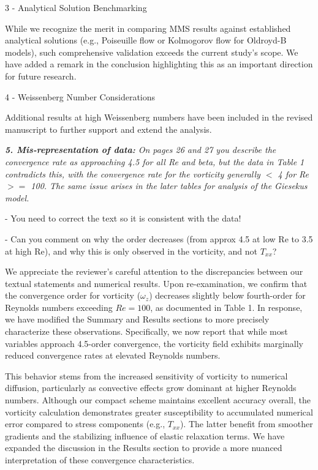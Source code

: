 \documentclass[12pt]{article}
\begin{document}
3 - Analytical Solution Benchmarking

While we recognize the merit in comparing MMS results against established analytical solutions (e.g., Poiseuille flow or Kolmogorov flow for Oldroyd-B models), such comprehensive validation exceeds the current study's scope. We have added a remark in the conclusion highlighting this as an important direction for future research.

4 - Weissenberg Number Considerations

Additional results at high Weissenberg numbers have been included in the revised manuscript to further support and extend the analysis.


\vspace{3mm}
{\it \textbf{5. Mis-representation of data:} On pages 26 and 27 you describe the convergence rate as approaching 4.5 for all Re and beta, but the data in Table 1 contradicts this, with the convergence rate for the vorticity generally $<$ 4 for Re $>=$ 100. The same issue arises in the later tables for analysis of the Giesekus model.

- You need to correct the text so it is consistent with the data!

- Can you comment on why the order decreases (from approx 4.5 at low Re to 3.5 at high Re), and why this is only observed in the vorticity, and not $T_{xx}$?}
\vspace{3mm}

We appreciate the reviewer's careful attention to the discrepancies between our textual statements and numerical results. Upon re-examination, we confirm that the convergence order for vorticity ($\omega_z$) decreases slightly below fourth-order for Reynolds numbers exceeding $Re = 100$, as documented in Table 1. In response, we have modified the Summary and Results sections to more precisely characterize these observations. Specifically, we now report that while most variables approach 4.5-order convergence, the vorticity field exhibits marginally reduced convergence rates at elevated Reynolds numbers.

This behavior stems from the increased sensitivity of vorticity to numerical diffusion, particularly as convective effects grow dominant at higher Reynolds numbers. Although our compact scheme maintains excellent accuracy overall, the vorticity calculation demonstrates greater susceptibility to accumulated numerical error compared to stress components (e.g., $T_{xx}$). The latter benefit from smoother gradients and the stabilizing influence of elastic relaxation terms. We have expanded the discussion in the Results section to provide a more nuanced interpretation of these convergence characteristics.
\end{document}

